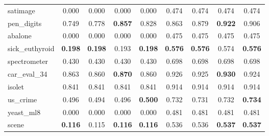 \begin{figure}[ht]
\begin{tabular}{p{22mm}|*4{p{14mm}}|*4{p{14mm}}}
        satimage&\multicolumn{1}{c}{0.000}&\multicolumn{1}{c}{0.000}&\multicolumn{1}{c}{0.000}&\multicolumn{1}{c|}{0.000}&\multicolumn{1}{c}{0.474}&\multicolumn{1}{c}{0.474}&\multicolumn{1}{c}{0.474}&\multicolumn{1}{c}{0.474}\\
        pen\_digits&\multicolumn{1}{c}{0.749}&\multicolumn{1}{c}{0.778}&\multicolumn{1}{c}{\textbf{0.857}}&\multicolumn{1}{c|}{0.828}&\multicolumn{1}{c}{0.863}&\multicolumn{1}{c}{0.879}&\multicolumn{1}{c}{\textbf{0.922}}&\multicolumn{1}{c}{0.906}\\
        abalone&\multicolumn{1}{c}{0.000}&\multicolumn{1}{c}{0.000}&\multicolumn{1}{c}{0.000}&\multicolumn{1}{c|}{0.000}&\multicolumn{1}{c}{0.475}&\multicolumn{1}{c}{0.475}&\multicolumn{1}{c}{0.475}&\multicolumn{1}{c}{0.475}\\
        sick\_euthyroid&\multicolumn{1}{c}{\textbf{0.198}}&\multicolumn{1}{c}{\textbf{0.198}}&\multicolumn{1}{c}{0.193}&\multicolumn{1}{c|}{\textbf{0.198}}&\multicolumn{1}{c}{\textbf{0.576}}&\multicolumn{1}{c}{\textbf{0.576}}&\multicolumn{1}{c}{0.574}&\multicolumn{1}{c}{\textbf{0.576}}\\
        spectrometer&\multicolumn{1}{c}{0.430}&\multicolumn{1}{c}{0.430}&\multicolumn{1}{c}{0.430}&\multicolumn{1}{c|}{0.430}&\multicolumn{1}{c}{0.698}&\multicolumn{1}{c}{0.698}&\multicolumn{1}{c}{0.698}&\multicolumn{1}{c}{0.698}\\
        car\_eval\_34&\multicolumn{1}{c}{0.863}&\multicolumn{1}{c}{0.860}&\multicolumn{1}{c}{\textbf{0.870}}&\multicolumn{1}{c|}{0.860}&\multicolumn{1}{c}{0.926}&\multicolumn{1}{c}{0.925}&\multicolumn{1}{c}{\textbf{0.930}}&\multicolumn{1}{c}{0.924}\\
        isolet&\multicolumn{1}{c}{0.841}&\multicolumn{1}{c}{0.841}&\multicolumn{1}{c}{0.841}&\multicolumn{1}{c|}{0.841}&\multicolumn{1}{c}{0.914}&\multicolumn{1}{c}{0.914}&\multicolumn{1}{c}{0.914}&\multicolumn{1}{c}{0.914}\\
        us\_crime&\multicolumn{1}{c}{0.496}&\multicolumn{1}{c}{0.494}&\multicolumn{1}{c}{0.496}&\multicolumn{1}{c|}{\textbf{0.500}}&\multicolumn{1}{c}{0.732}&\multicolumn{1}{c}{0.731}&\multicolumn{1}{c}{0.732}&\multicolumn{1}{c}{\textbf{0.734}}\\
        yeast\_ml8&\multicolumn{1}{c}{0.000}&\multicolumn{1}{c}{0.000}&\multicolumn{1}{c}{0.000}&\multicolumn{1}{c|}{0.000}&\multicolumn{1}{c}{0.481}&\multicolumn{1}{c}{0.481}&\multicolumn{1}{c}{0.481}&\multicolumn{1}{c}{0.481}\\
        scene&\multicolumn{1}{c}{\textbf{0.116}}&\multicolumn{1}{c}{0.115}&\multicolumn{1}{c}{\textbf{0.116}}&\multicolumn{1}{c|}{\textbf{0.116}}&\multicolumn{1}{c}{0.536}&\multicolumn{1}{c}{0.536}&\multicolumn{1}{c}{\textbf{0.537}}&\multicolumn{1}{c}{\textbf{0.537}}\\

\end{tabular}
\end{figure}
